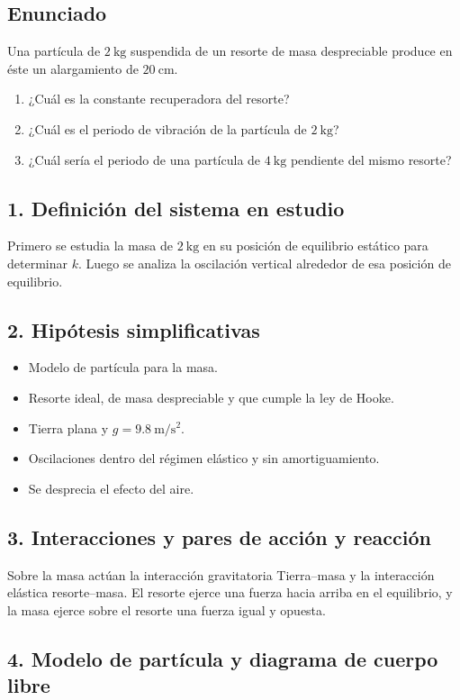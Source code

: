 \documentclass[12pt]{article}
\newcommand{\paso}[2]{%
  \subsection*{\color{AzulFisica}#1. #2}%
}
\begin{document}
\subsection*{Enunciado}
Una partícula de $\SI{2}{\kilogram}$ suspendida de un resorte de masa despreciable produce en éste un alargamiento de $\SI{20}{\centi\meter}$.
\begin{enumerate}[label=\alph*)]
  \item ¿Cuál es la constante recuperadora del resorte?
  \item ¿Cuál es el periodo de vibración de la partícula de $\SI{2}{\kilogram}$?
  \item ¿Cuál sería el periodo de una partícula de $\SI{4}{\kilogram}$ pendiente del mismo resorte?
\end{enumerate}

\paso{1}{Definición del sistema en estudio}
Primero se estudia la masa de $\SI{2}{\kilogram}$ en su posición de equilibrio estático para determinar $k$. Luego se analiza la oscilación vertical alrededor de esa posición de equilibrio.

\paso{2}{Hipótesis simplificativas}
\begin{itemize}[itemsep=2pt]
  \item Modelo de partícula para la masa.
  \item Resorte ideal, de masa despreciable y que cumple la ley de Hooke.
  \item Tierra plana y $g=\SI{9.8}{\meter\per\second\squared}$.
  \item Oscilaciones dentro del régimen elástico y sin amortiguamiento.
  \item Se desprecia el efecto del aire.
\end{itemize}

\paso{3}{Interacciones y pares de acción y reacción}
Sobre la masa actúan la interacción gravitatoria Tierra--masa y la interacción elástica resorte--masa. El resorte ejerce una fuerza hacia arriba en el equilibrio, y la masa ejerce sobre el resorte una fuerza igual y opuesta.

\paso{4}{Modelo de partícula y diagrama de cuerpo libre}
\begin{center}
\end{center}
\end{document}
